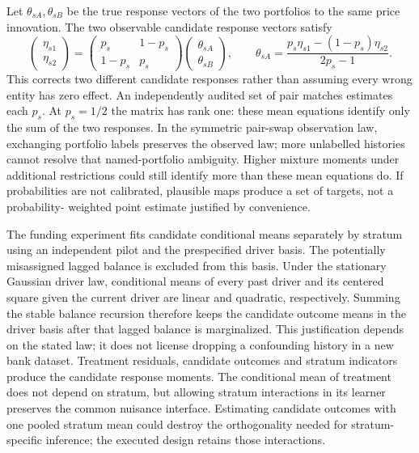 Let $\theta_{sA},\theta_{sB}$ be the true response vectors of the two
portfolios to the same price innovation. The two observable candidate
response vectors satisfy
\begin{equation}
 \begin{pmatrix}\eta_{s1}\\\eta_{s2}\end{pmatrix}
 =\begin{pmatrix}p_s&1-p_s\\1-p_s&p_s\end{pmatrix}
   \begin{pmatrix}\theta_{sA}\\\theta_{sB}\end{pmatrix},\qquad
 \theta_{sA}=\frac{p_s\eta_{s1}-(1-p_s)\eta_{s2}}{2p_s-1}.
 \label{s6:pair-mixing}
\end{equation}
This corrects two different candidate responses rather than assuming every
wrong entity has zero effect. An independently audited set of pair matches
estimates each $p_s$. At $p_s=1/2$ the matrix has rank one: these mean
equations identify only the sum of the two responses. In the symmetric
pair-swap observation law, exchanging portfolio labels preserves the
observed law; more unlabelled histories cannot resolve that named-portfolio
ambiguity. Higher mixture moments under additional restrictions could still
identify more than these mean equations do. If probabilities are not
calibrated, plausible maps produce a set of targets, not a probability-
weighted point estimate justified by convenience.

The funding experiment fits candidate conditional means separately by
stratum using an independent pilot and the prespecified driver basis.
The potentially misassigned lagged balance is excluded from this basis.
Under the stationary Gaussian driver law, conditional means of every past
driver and its centered square given the current driver are linear and
quadratic, respectively. Summing the stable balance recursion therefore
keeps the candidate outcome means in the driver basis after that lagged
balance is marginalized. This justification depends on the stated law;
it does not license dropping a confounding history in a new bank dataset.
Treatment residuals, candidate outcomes and stratum indicators produce
the candidate response moments. The conditional mean of treatment does
not depend on stratum, but allowing stratum interactions in its learner
preserves the common nuisance interface. Estimating candidate outcomes with
one pooled stratum mean could destroy the orthogonality needed for
stratum-specific inference; the executed design retains those interactions.


